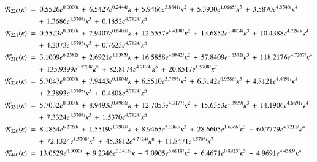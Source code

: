 \begin{align}
	\label{eq:cw_fit_1}
	\SC_{220}(\kappa) \; &= \;0.5526 e^{0.0000 i}\, + \, 6.5427  e^{0.2444 i} \kappa\, + \, 5.9466  e^{3.8841 i} \kappa ^ 2\, + \, 5.3930  e^{1.0165 i} \kappa ^ 3\, + \, 3.5870  e^{4.5340 i} \kappa ^ 4\\ \nonumber
	&\quad\, + \, 1.3686  e^{1.5708 i} \kappa ^ 5\, + \, 0.1852  e^{4.7124 i} \kappa ^ 6 \\ 
	\label{eq:cw_fit_2}
	\SC_{221}(\kappa) \; &= \;0.5523 e^{0.0000 i}\, + \, 7.9407  e^{0.6408 i} \kappa\, + \, 12.5557  e^{4.4198 i} \kappa ^ 2\, + \, 13.6852  e^{1.4804 i} \kappa ^ 3\, + \, 10.4388  e^{4.7260 i} \kappa ^ 4\\ \nonumber
	&\quad\, + \, 4.2073  e^{1.5708 i} \kappa ^ 5\, + \, 0.7623  e^{4.7124 i} \kappa ^ 6 \\ 
	\label{eq:cw_fit_3}
	\SC_{210}(\kappa) \; &= \;3.1009 e^{6.2582 i}\, + \, 2.6921  e^{1.9585 i} \kappa\, + \, 16.5858  e^{4.9842 i} \kappa ^ 2\, + \, 57.8409  e^{1.6372 i} \kappa ^ 3\, + \, 118.2176  e^{4.7267 i} \kappa ^ 4\\ \nonumber
	&\quad\, + \, 135.9399  e^{1.5708 i} \kappa ^ 5\, + \, 82.8174  e^{4.7124 i} \kappa ^ 6\, + \, 20.8517  e^{1.5708 i} \kappa ^ 7 \\ 
	\label{eq:cw_fit_4}
	\SC_{330}(\kappa) \; &= \;5.7047 e^{0.0000 i}\, + \, 7.9443  e^{0.1804 i} \kappa\, + \, 6.5510  e^{3.7793 i} \kappa ^ 2\, + \, 6.3142  e^{0.9386 i} \kappa ^ 3\, + \, 4.8121  e^{4.4691 i} \kappa ^ 4\\ \nonumber
	&\quad\, + \, 2.3893  e^{1.5708 i} \kappa ^ 5\, + \, 0.4808  e^{4.7124 i} \kappa ^ 6 \\ 
	\label{eq:cw_fit_5}
	\SC_{331}(\kappa) \; &= \;5.7032 e^{0.0000 i}\, + \, 8.9493  e^{0.4983 i} \kappa\, + \, 12.7053  e^{4.3177 i} \kappa ^ 2\, + \, 15.6353  e^{1.3939 i} \kappa ^ 3\, + \, 14.1906  e^{4.6691 i} \kappa ^ 4\\ \nonumber
	&\quad\, + \, 7.3324  e^{1.5708 i} \kappa ^ 5\, + \, 1.5370  e^{4.7124 i} \kappa ^ 6 \\ 
	\label{eq:cw_fit_6}
	\SC_{320}(\kappa) \; &= \;8.1854 e^{6.2760 i}\, + \, 1.5519  e^{1.7909 i} \kappa\, + \, 8.9465  e^{5.1868 i} \kappa ^ 2\, + \, 28.6605  e^{1.6366 i} \kappa ^ 3\, + \, 60.7779  e^{4.7211 i} \kappa ^ 4\\ \nonumber
	&\quad\, + \, 72.1324  e^{1.5708 i} \kappa ^ 5\, + \, 45.3812  e^{4.7124 i} \kappa ^ 6\, + \, 11.8471  e^{1.5708 i} \kappa ^ 7 \\ 
	\label{eq:cw_fit_7}
	\SC_{440}(\kappa) \; &= \;13.0529 e^{0.0000 i}\, + \, 9.2346  e^{0.1418 i} \kappa\, + \, 7.0905  e^{3.6918 i} \kappa ^ 2\, + \, 6.4671  e^{0.8925 i} \kappa ^ 3\, + \, 4.9691  e^{4.4385 i} \kappa ^ 4\\ \nonumber

\end{align}
